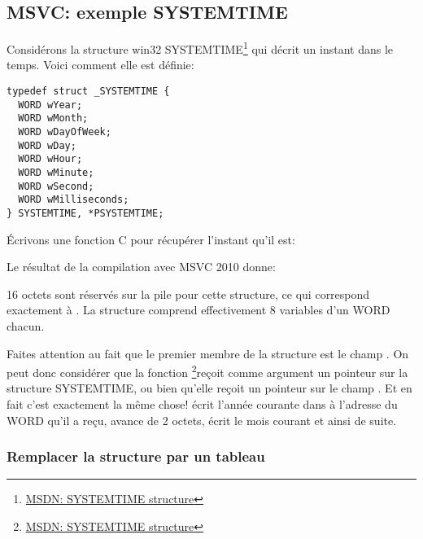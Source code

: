 ﻿\subsection{MSVC: exemple SYSTEMTIME}
\label{sec:SYSTEMTIME}

\newcommand{\FNSYSTEMTIME}{\footnote{\href{http://msdn.microsoft.com/en-us/library/ms724950(VS.85).aspx}{MSDN: SYSTEMTIME structure}}}

Considérons la structure win32 SYSTEMTIME\FNSYSTEMTIME{} qui décrit un instant dans le temps. Voici
comment elle est définie:

\begin{lstlisting}[caption=WinBase.h,style=customc]
typedef struct _SYSTEMTIME {
  WORD wYear;
  WORD wMonth;
  WORD wDayOfWeek;
  WORD wDay;
  WORD wHour;
  WORD wMinute;
  WORD wSecond;
  WORD wMilliseconds;
} SYSTEMTIME, *PSYSTEMTIME;
\end{lstlisting}

Écrivons une fonction C pour récupérer l'instant qu'il est:



Le résultat de la compilation avec MSVC 2010 donne:



16 octets sont réservés sur la pile pour cette structure, ce qui correspond exactement à
. La structure comprend effectivement 8 variables d'un WORD chacun.

\newcommand{\FNMSDNGST}{\footnote{\href{http://msdn.microsoft.com/en-us/library/ms724390(VS.85).aspx}{MSDN: GetSystemTime function}}}

Faites attention au fait que le premier membre de la structure est le champ .
On peut donc considérer que la fonction \FNSYSTEMTIME reçoit comme argument
un pointeur sur la structure SYSTEMTIME, ou bien qu'elle reçoit un pointeur sur le champ .
Et en fait c'est exactement la même chose!
 écrit l'année courante dans à l'adresse du WORD qu'il a reçu, avance de 2
octets, écrit le mois courant et ainsi de suite.



\subsubsection{Remplacer la structure par un tableau}

